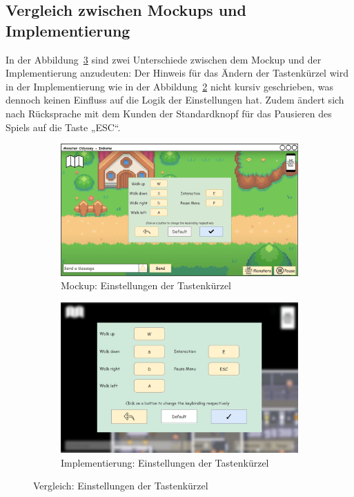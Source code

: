 \subsection{Vergleich zwischen Mockups und Implementierung}\label{subsec:vergleich-zwischen-mockups-und-implementierung-keybindings-settings}
In der Abbildung~\ref{fig: Vergleich: Einstellungen der Tastenkürzel} sind zwei Unterschiede zwischen dem Mockup und der Implementierung anzudeuten: Der Hinweis für das Ändern der Tastenkürzel wird in der Implementierung wie in der Abbildung~\ref{fig: Implementierung: Einstellungen der Tastenkürzel} nicht kursiv geschrieben, was dennoch keinen Einfluss auf die Logik der Einstellungen hat. Zudem ändert sich nach Rücksprache mit dem Kunden der Standardknopf für das Pausieren des Spiels auf die Taste „ESC“.
\begin{figure}[H]
    \centering
    \begin{subfigure}[b]{0.4\textwidth}
        \includegraphics[width=\textwidth]{images/mockups/Bonusfeatures/Keybindings/KeybindingsSettings.png}
        \caption{Mockup: Einstellungen der Tastenkürzel}
        \label{fig: Mockup: Einstellungen der Tastenkürzel}
    \end{subfigure}
    \hfill
    \begin{subfigure}[b]{0.4\textwidth}
        \includegraphics[width=\textwidth]{images/implementation/Bonusfeatures/Keybindings/SettingsKeyImp.png}
        \caption{Implementierung: Einstellungen der Tastenkürzel}
        \label{fig: Implementierung: Einstellungen der Tastenkürzel}
    \end{subfigure}
    \caption{Vergleich: Einstellungen der Tastenkürzel}
    \label{fig: Vergleich: Einstellungen der Tastenkürzel}
\end{figure}
